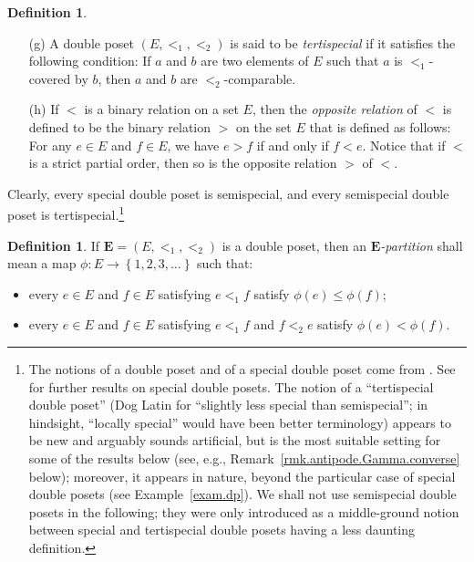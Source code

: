 \documentclass[12pt]{article}
\theoremstyle{plain}
\theoremstyle{definition}
\newtheorem{definition}[theorem]{Definition}
\theoremstyle{remark}
\newcommand{\EE}{{\mathbf{E}}}
\begin{document}
\begin{definition}
\begin{itemize}
\item[(g)] A double poset
$\left(E, <_1, <_2\right)$ is said to be \textit{tertispecial} if
it satisfies the following condition: If $a$ and $b$ are two
elements of $E$ such that $a$ is $<_1$-covered by $b$, then $a$
and $b$ are $<_2$-comparable.

\item[(h)] If $<$ is a binary relation on a set $E$, then the
\textit{opposite relation} of $<$ is defined to be the binary
relation $>$ on the set $E$ that is defined as follows: For any
$e \in E$ and $f \in E$, we have $e > f$ if and only if $f < e$.
Notice that if $<$ is a strict partial order, then so
is the opposite relation $>$ of $<$.
\end{itemize}
\end{definition}

Clearly, every special double poset is semispecial, and every
semispecial double poset is tertispecial.\footnote{The notions of a
double poset and of a special double poset come from
\cite{Mal-Reu-DP}. See \cite{Foissy13} for further results on
special double posets.
The notion of a ``tertispecial double poset''
(Dog Latin for ``slightly less special than semispecial''; in
hindsight, ``locally special'' would have been better terminology)
appears to be new and arguably sounds artificial, but is the
most suitable setting for some of the results below (see, e.g.,
Remark~\ref{rmk.antipode.Gamma.converse} below); moreover,
it appears in nature, beyond the particular case of special
double posets (see Example~\ref{exam.dp}).
We shall not use semispecial
double posets in the following; they were only introduced as a
middle-ground notion between special and tertispecial double posets
having a less daunting definition.}

\begin{definition}
\label{def.E-partition}
If $\EE = \left(E, <_1, <_2\right)$ is a double poset, then
an \textit{$\EE$-partition} shall mean a map
$\phi : E \to \left\{ 1,2,3,\ldots\right\}$ such that:
\begin{itemize}
\item every $e \in E$ and $f \in E$ satisfying $e <_1 f$ satisfy
$\phi\left(e\right) \leq \phi\left(f\right)$;
\item every $e \in E$ and $f \in E$ satisfying $e <_1 f$ and
$f <_2 e$ satisfy $\phi\left(e\right) < \phi\left(f\right)$.
\end{itemize}
\end{definition}
\end{document}
